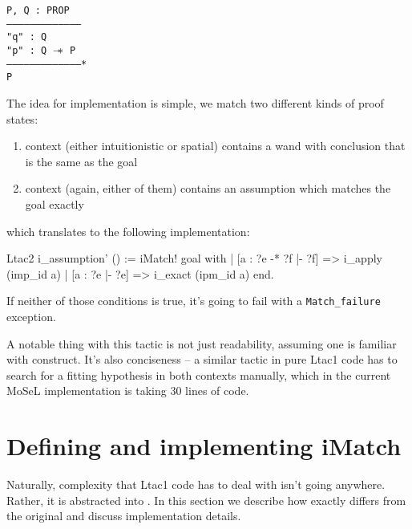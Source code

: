 \begin{minipage}{\linewidth}
\texttt{P, Q : PROP\\
---------------------------------------\\
"q" : Q\\
"p" : Q $\mathrel{-\mkern-6mu*}$ P\\
---------------------------------------*\\
P
}
\end{minipage}

The idea for implementation is simple, we match two different kinds of proof states:
\begin{enumerate}
\item context (either intuitionistic or spatial) contains a wand with conclusion that is the same as the goal
\item context (again, either of them) contains an assumption which matches the goal exactly
\end{enumerate}

which translates to the following implementation:

\begin{minipage}{\linewidth}
\begin{coq}
Ltac2 i_assumption' () :=
  iMatch! goal with
  | [a : ?e -* ?f |- ?f] => i_apply (imp_id a)
  | [a : ?e |- ?e] => i_exact (ipm_id a)
  end.
\end{coq}
\end{minipage}

If neither of those conditions is true, it's going to fail with a {\color{red} \texttt{Match\_failure}} exception.

A notable thing with this tactic is not just readability, assuming one is familiar with  construct.
It's also conciseness -- a similar tactic in pure Ltac1 code has to search for a fitting hypothesis in both contexts manually, which in the current MoSeL implementation is taking 30 lines of code.

\section{Defining and implementing iMatch}
\label{sec:defin-impl-imatch}

Naturally, complexity that Ltac1 code has to deal with isn't going anywhere.
Rather, it is abstracted into .
In this section we describe how exactly  differs from the original  and discuss implementation details.

